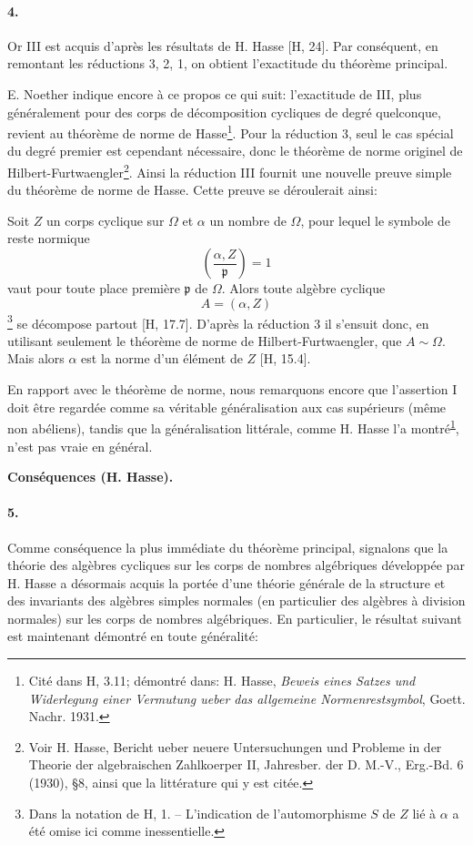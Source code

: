 \paragraph{4.}
Or III est acquis d'après les résultats de H. Hasse [H, 24]. Par conséquent, en remontant les réductions 3, 2, 1, on obtient l'exactitude du théorème principal.

E. Noether indique encore à ce propos ce qui suit: l'exactitude de III, plus généralement pour des corps de décomposition cycliques de degré quelconque, revient au théorème de norme de Hasse\footnote{\label{fn:p38-hasse-normensatz}Cité dans H, 3.11; démontré dans: H. Hasse, \emph{Beweis eines Satzes und Widerlegung einer Vermutung ueber das allgemeine Normenrestsymbol}, Goett. Nachr. 1931.}. Pour la réduction 3, seul le cas spécial du degré premier est cependant nécessaire, donc le théorème de norme originel de Hilbert-Furtwaengler\footnote{Voir H. Hasse, Bericht ueber neuere Untersuchungen und Probleme in der Theorie der algebraischen Zahlkoerper II, Jahresber. der D. M.-V., Erg.-Bd. 6 (1930), \S 8, ainsi que la littérature qui y est citée.}. Ainsi la réduction III fournit une nouvelle preuve simple du théorème de norme de Hasse. Cette preuve se déroulerait ainsi:

Soit \(Z\) un corps cyclique sur \(\Omega\) et \(\alpha\) un nombre de \(\Omega\), pour lequel le symbole de reste normique
\[
\left(\frac{\alpha,Z}{\mathfrak p}\right)=1
\]
vaut pour toute place première \(\mathfrak p\) de \(\Omega\). Alors toute algèbre cyclique
\[
A=(\alpha,Z)
\]
\footnote{Dans la notation de H, 1. -- L'indication de l'automorphisme \(S\) de \(Z\) lié à \(\alpha\) a été omise ici comme inessentielle.} se décompose partout [H, 17.7]. D'après la réduction 3 il s'ensuit donc, en utilisant seulement le théorème de norme de Hilbert-Furtwaengler, que \(A\sim\Omega\). Mais alors \(\alpha\) est la norme d'un élément de \(Z\) [H, 15.4].

En rapport avec le théorème de norme, nous remarquons encore que l'assertion I doit être regardée comme sa véritable généralisation aux cas supérieurs (même non abéliens), tandis que la généralisation littérale, comme H. Hasse l'a montré\textsuperscript{\ref{fn:p38-hasse-normensatz}}, n'est pas vraie en général.

\begin{center}
\textbf{Conséquences (H. Hasse).}
\end{center}

\paragraph{5.}
Comme conséquence la plus immédiate du théorème principal, signalons que la théorie des algèbres cycliques sur les corps de nombres algébriques développée par H. Hasse a désormais acquis la portée d'une théorie générale de la structure et des invariants des algèbres simples normales (en particulier des algèbres à division normales) sur les corps de nombres algébriques. En particulier, le résultat suivant est maintenant démontré en toute généralité:

